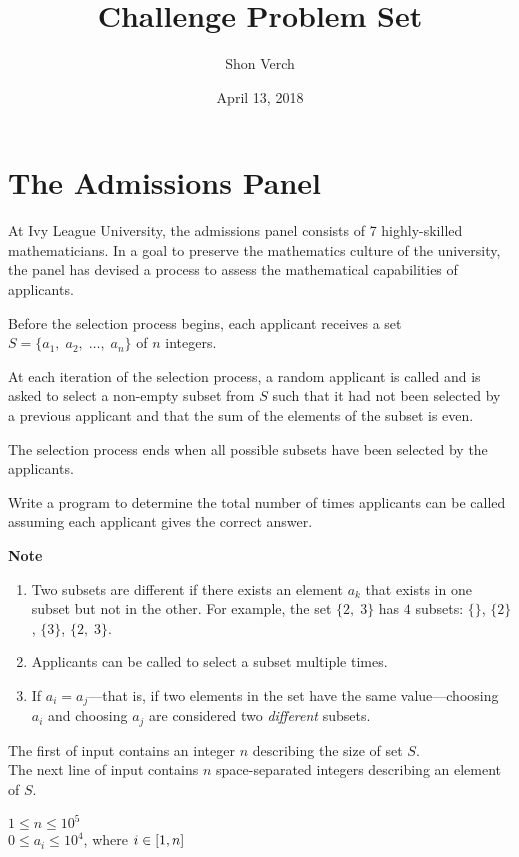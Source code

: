 \documentclass{problem-set}
\title{Challenge Problem Set}
\date{April 13, 2018}
\author{Shon Verch}
\begin{document}
\maketitle

\section{The Admissions Panel}
At Ivy League University, the admissions panel consists of 
7 highly-skilled mathematicians. In a goal to preserve the 
mathematics culture of the university, the panel has devised 
a process to assess the mathematical capabilities of applicants.

Before the selection process begins, each applicant receives a set 
$S = \{a_1,\;a_2,\;\ldots,\;a_n\}$ of $n $ integers. 

At each iteration of the selection process, a random applicant is called 
and is asked to select a non-empty subset from $S$ such that it 
had not been selected by a previous applicant and that the sum of 
the elements of the subset is even.

The selection process ends when all possible subsets have been
 selected by the applicants.

Write a program to determine the total number of times applicants 
can be called assuming each applicant gives the correct answer.

\noindent
\textbf{Note}
\begin{enumerate}
    \item Two subsets are different if there exists an element $a_k$ 
    that exists in one subset but not in the other. For example, 
    the set $\{2,\;3\}$ has $4$ subsets: $\{\}$, $\{2\}$, $\{3\}$, 
    $\{2,\;3\}$.
    \item Applicants can be called to select a subset multiple times.
    \item If $a_i=a_j$---that is, if two elements in the set have 
    the same value---choosing $a_i$ and choosing $a_j$ are considered 
    two \textit{different} subsets.
\end{enumerate}

The first of input contains an integer $n$ describing the size of set $S$.\\
The next line of input contains $n$ space-separated integers describing an element of $S$.

\constraints
$1 \leq n \leq 10^5$\\
$0 \leq a_i \leq 10^4$, where $i \in \interval{1}{n}$
\end{document}
